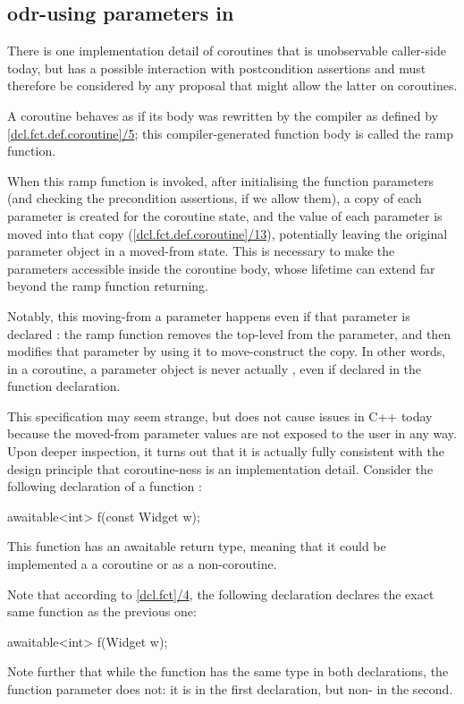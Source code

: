 \subsection{odr-using parameters in }
\label{paramsinpost}

There is one implementation detail of coroutines that is unobservable caller-side today, but has a possible interaction with postcondition assertions and must therefore be considered by any proposal that might allow the latter on coroutines.

A coroutine behaves as if its body was rewritten by the compiler as defined by \href{https://eel.is/c++draft/dcl.fct.def.coroutine#5}{[dcl.fct.def.coroutine]/5}; this compiler-generated function body is called the ramp function.

When this ramp function is invoked, after initialising the function parameters (and checking the precondition assertions, if we allow them), a copy of each parameter is created for the coroutine state, and the value of each parameter is moved into that copy (\href{https://eel.is/c++draft/dcl.fct.def.coroutine#13}{[dcl.fct.def.coroutine]/13}), potentially leaving the original parameter object in a moved-from state. This is necessary to make the parameters accessible inside the coroutine body, whose lifetime can extend far beyond the ramp function returning.

Notably, this moving-from a parameter happens even if that parameter is declared : the ramp function removes the top-level  from the parameter, and then modifies that parameter by using it to move-construct the copy. In other words, in a coroutine, a parameter object is never actually , even if declared  in the function declaration.

This specification may seem strange, but does not cause issues in C++ today because the moved-from parameter values are not exposed to the user in any way. Upon deeper inspection, it turns out that it is actually fully consistent with the design principle that coroutine-ness is an implementation detail. Consider the following declaration of a function :
\begin{codeblock}
awaitable<int> f(const Widget w);
\end{codeblock}
This function has an awaitable return type, meaning that it could be implemented a a coroutine or as a non-coroutine.

Note that according to \href{https://eel.is/c++draft/dcl.fct#4.sentence-2}{[dcl.fct]/4}, the following declaration declares the exact same function as the previous one:
\begin{codeblock}
awaitable<int> f(Widget w);
\end{codeblock}
Note further that while the function  has the same type in both declarations, the function parameter  does not: it is  in the first declaration, but non- in the second.


